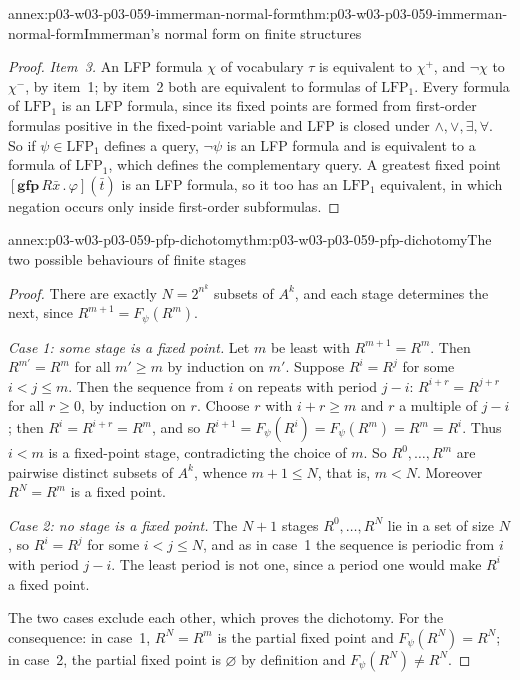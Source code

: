 \begin{annexitem}{annex:p03-w03-p03-059-immerman-normal-form}{thm:p03-w03-p03-059-immerman-normal-form}{Immerman's normal form on finite structures}
\begin{proof}
\emph{Item~3.} An LFP formula \(\chi\) of vocabulary \(\tau\) is equivalent
to \(\chi^+\), and \(\neg\chi\) to \(\chi^-\), by item~1; by item~2 both are
equivalent to formulas of \(\mathrm{LFP}_1\). Every formula of
\(\mathrm{LFP}_1\) is an LFP formula, since its fixed points are formed
from first-order formulas positive in the fixed-point variable and LFP is
closed under \(\land,\lor,\exists,\forall\). So if \(\psi\in\mathrm{LFP}_1\)
defines a query, \(\neg\psi\) is an LFP formula and is equivalent to a
formula of \(\mathrm{LFP}_1\), which defines the complementary query. A
greatest fixed point \([\mathbf{gfp}\,R\bar x\,.\,\varphi](\bar t)\) is an
LFP formula, so it too has an \(\mathrm{LFP}_1\) equivalent, in which
negation occurs only inside first-order subformulas.
\end{proof}
\end{annexitem}

\begin{annexitem}{annex:p03-w03-p03-059-pfp-dichotomy}{thm:p03-w03-p03-059-pfp-dichotomy}{The two possible behaviours of finite stages}
\begin{proof}
There are exactly \(N=2^{n^k}\) subsets of \(A^k\), and each stage
determines the next, since \(R^{m+1}=F_\psi(R^m)\).

\emph{Case 1: some stage is a fixed point.} Let \(m\) be least with
\(R^{m+1}=R^m\). Then \(R^{m'}=R^m\) for all \(m'\geq m\) by induction on
\(m'\). Suppose \(R^i=R^j\) for some \(i<j\leq m\). Then the sequence from
\(i\) on repeats with period \(j-i\): \(R^{i+r}=R^{j+r}\) for all
\(r\geq0\), by induction on \(r\). Choose \(r\) with \(i+r\geq m\) and
\(r\) a multiple of \(j-i\); then \(R^i=R^{i+r}=R^m\), and so
\(R^{i+1}=F_\psi(R^i)=F_\psi(R^m)=R^m=R^i\). Thus \(i<m\) is a fixed-point
stage, contradicting the choice of \(m\). So \(R^0,\ldots,R^m\) are
pairwise distinct subsets of \(A^k\), whence \(m+1\leq N\), that is,
\(m<N\). Moreover \(R^N=R^m\) is a fixed point.

\emph{Case 2: no stage is a fixed point.} The \(N+1\) stages
\(R^0,\ldots,R^N\) lie in a set of size \(N\), so \(R^i=R^j\) for some
\(i<j\leq N\), and as in case~1 the sequence is periodic from \(i\) with
period \(j-i\). The least period is not one, since a period one would make
\(R^i\) a fixed point.

The two cases exclude each other, which proves the dichotomy. For the
consequence: in case~1, \(R^N=R^m\) is the partial fixed point and
\(F_\psi(R^N)=R^N\); in case~2, the partial fixed point is \(\varnothing\)
by definition and \(F_\psi(R^N)\neq R^N\).
\end{proof}
\end{annexitem}

